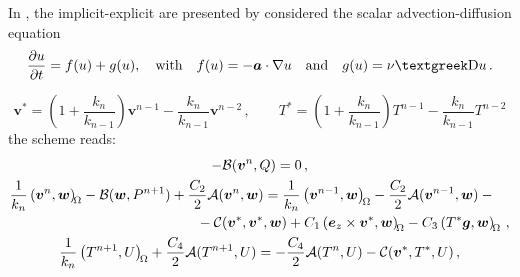 In \cite{Ascher1995}, the implicit-explicit are presented by considered the scalar advection-diffusion equation
\begin{equation}
	\pd{u}{t}=f(u)+g(u),\quad\text{with}\quad
	f(u)=-\bm{a}\cdot\nabla u\quad\text{and}\quad
	g(u)=\nu\laplace u\,.
\end{equation}


\begin{equation}
	\bm{v}^*=\left(1+\frac{k_n}{k_{n-1}}\right)\bm{v}^{n-1}-\frac{k_n}{k_{n-1}}\bm{v}^{n-2}\,,\qquad
	T^*=\left(1+\frac{k_n}{k_{n-1}}\right)T^{n-1}-\frac{k_n}{k_{n-1}}T^{n-2}
\end{equation}
the scheme reads:
\begin{gather}
	-\saddle{\bm{v}^{n}}{Q}=0\,, \\
	\begin{multlined}[c]
	\frac{1}{k_n}\inner{\bm{v}^{n}}{\bm{w}}-\saddle{\bm{w}}{P^{n+1}}+\frac{C_2}{2}\elliptic{\bm{v}^n}{\bm{w}}=\frac{1}{k_n}\inner{\bm{v}^{n-1}}{\bm{w}}-\frac{C_2}{2}\elliptic{\bm{v}^{n-1}}{\bm{w}}-{}\\
	-\convec{\bm{v}^*}{\bm{v}^*}{\bm{w}}+C_1\inner{\ez\times\bm{v}^*}{\bm{w}}-C_3\inner{T^*\bm{g}}{\bm{w}}\,,
	\end{multlined}\\
	\frac{1}{k_n}\inner{T^{n+1}}{U}+\frac{C_4}{2}\elliptic{T^{n+1}}{U}=-\frac{C_4}{2}\elliptic{T^n}{U}-\convec{\bm{v}^*}{T^*}{U}\,,
\end{gather}

